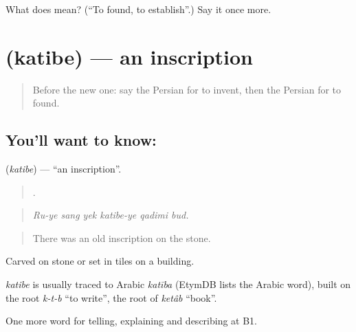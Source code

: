 \begin{tcolorbox}[breakable,colback=teal!4,colframe=teal!35!black,title={Before you move on}]
What does   mean? (\textquotedblleft{}To found, to establish\textquotedblright{}.) Say it once more.
\end{tcolorbox}
\section[\texorpdfstring{\fa{کتیبه} (katibe)}{کتیبه (katibe)}]{ (katibe) — an inscription}

\label{lesson:FA-C354-katibe}



\begin{quote}
Before the new one: say the Persian for to invent, then the Persian for to found.
\end{quote}

\subsection*{You'll want to know: }
\textbf{} (\emph{katibe}) — \textquotedblleft{}an inscription\textquotedblright{}.

\begin{quote}
     .
\end{quote}

\begin{quote}
\emph{Ru-ye sang yek katibe-ye qadimi bud.}
\end{quote}

\begin{quote}
There was an old inscription on the stone.
\end{quote}

Carved on stone or set in tiles on a building.

\begin{cousinweb}
\emph{katibe} is usually traced to Arabic \emph{katība} (EtymDB lists the Arabic word), built on the root \emph{k-t-b} \textquotedblleft{}to write\textquotedblright{}, the root of \emph{ketâb} \textquotedblleft{}book\textquotedblright{}.
\end{cousinweb}

\begin{grammarlens}[title={What you've built}]
One more word for telling, explaining and describing at B1.
\end{grammarlens}

